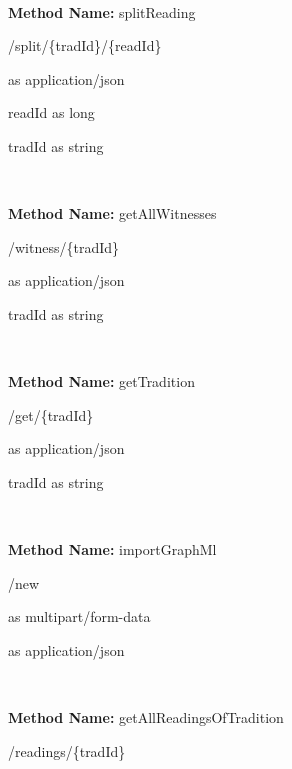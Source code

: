 \

\textbf{Method Name: }splitReading
\begin{post}
/split/\{tradId\}/\{readId\}
\end{post}

\begin{response}
 as application/json
\end{response}

\begin{parameter}
readId as long
\end{parameter}

\begin{parameter}
tradId as string
\end{parameter}

\

\textbf{Method Name: }getAllWitnesses
\begin{get}
/witness/\{tradId\}
\end{get}

\begin{response}
 as application/json
\end{response}

\begin{parameter}
tradId as string
\end{parameter}

\

\textbf{Method Name: }getTradition
\begin{get}
/get/\{tradId\}
\end{get}

\begin{response}
 as application/json
\end{response}

\begin{parameter}
tradId as string
\end{parameter}

\

\textbf{Method Name: }importGraphMl
\begin{post}
/new
\end{post}

\begin{request}
 as multipart/form-data
\end{request}

\begin{response}
 as application/json
\end{response}

\

\textbf{Method Name: }getAllReadingsOfTradition
\begin{get}
/readings/\{tradId\}
\end{get}

